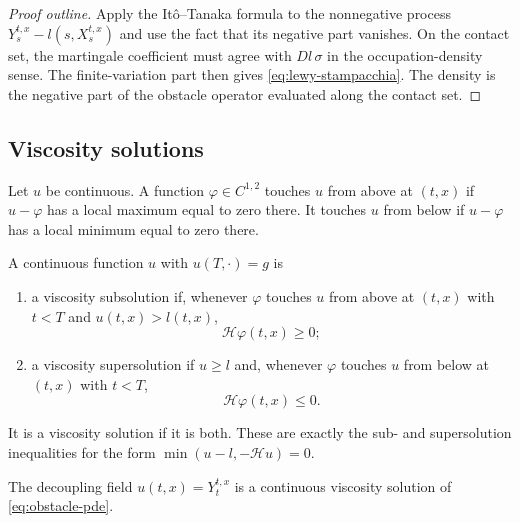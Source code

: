 \begin{proof}[Proof outline]
Apply the It\^o--Tanaka formula to the nonnegative process
$Y_s^{t,x}-l(s,X_s^{t,x})$ and use the fact that its negative part vanishes.
On the contact set, the martingale coefficient must agree with
$Dl\,\sigma$ in the occupation-density sense. The finite-variation part then
gives \eqref{eq:lewy-stampacchia}. The density is the negative part of the obstacle
operator evaluated along the contact set.
\end{proof}

\subsection{Viscosity solutions}

\begin{definition}
Let $u$ be continuous. A function $\varphi\in C^{1,2}$ touches $u$ from above
at $(t,x)$ if $u-\varphi$ has a local maximum equal to zero there. It touches
$u$ from below if $u-\varphi$ has a local minimum equal to zero there.
\end{definition}

\begin{definition}
A continuous function $u$ with $u(T,\cdot)=g$ is
\begin{enumerate}[label=(\roman*)]
  \item a viscosity subsolution if, whenever $\varphi$ touches $u$ from above
        at $(t,x)$ with $t<T$ and $u(t,x)>l(t,x)$,
        \[
          \mathcal H\varphi(t,x)\geq0;
        \]
  \item a viscosity supersolution if $u\geq l$ and, whenever $\varphi$
        touches $u$ from below at $(t,x)$ with $t<T$,
        \[
          \mathcal H\varphi(t,x)\leq0.
        \]
\end{enumerate}
It is a viscosity solution if it is both. These are exactly the sub- and
supersolution inequalities for the form
$\min(u-l,-\mathcal H u)=0$.
\end{definition}

\begin{theorem}
The decoupling field $u(t,x)=Y_t^{t,x}$ is a continuous viscosity solution of
\eqref{eq:obstacle-pde}.
\end{theorem}

